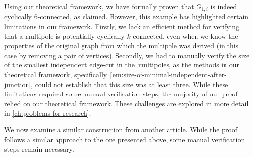 \documentclass[12pt, twoside]{book}
\begin{document}
Using our theoretical framework, we have formally proven that $G_{1,i}$ is indeed cyclically 6-connected, as claimed. However, this example has highlighted certain limitations in our framework. Firstly, we lack an efficient method for verifying that a multipole is potentially cyclically $k$-connected, even when we know the properties of the original graph from which the multipole was derived (in this case by removing a pair of vertices). Secondly, we had to manually verify the size of the smallest independent edge-cut in the~multipoles, as the methods in our theoretical framework, specifically \cref{lem:size-of-minimal-independent-after-junction}, could not establish that this size was at least three. While these limitations required some manual verification steps, the majority of our proof relied on our theoretical framework. These challenges are explored in more detail in \cref{ch:problems-for-research}.

We now examine a similar construction from another article. While the proof follows a similar approach to the one presented above, some manual verification steps remain necessary.
\end{document}
